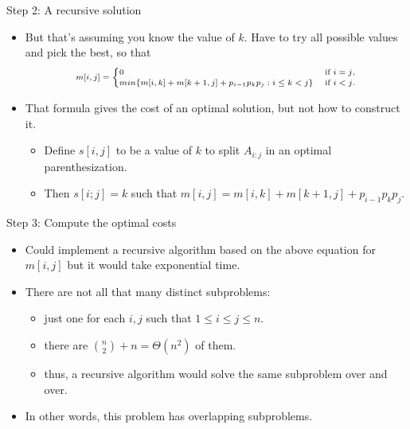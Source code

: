 \documentclass[aspectratio=169]{beamer}
\begin{document}
\begin{frame}{Step 2: A recursive solution}
    \begin{itemize}
        \item But that's assuming you know the value of $k$. Have to try all possible values and pick the best, so that
            \begin{equation*}
                \scriptsize
                \begin{align*}
                    m[i, j] =
                        \begin{cases}
                            0 & \text{ if } i = j \text{,} \\
                            min \{ m[i, k] + m[k+1, j] + p_{i-1} p_k p_j : i \leq k < j \} & \text{ if } i < j \text{.}
                        \end{cases}
                \end{align*}
            \end{equation*}
        \item That formula gives the cost of an optimal solution, but not how to construct it.
            \begin{itemize}
                \item Deﬁne $s[i, j]$ to be a value of $k$ to split $A_{i:j}$ in an optimal parenthesization.
                \item Then $s[i; j] = k$ such that $m[i, j] = m[i, k] + m[k+1, j] + p_{i-1} p_k p_j$.
            \end{itemize}
    \end{itemize}
\end{frame}

\begin{frame}{Step 3: Compute the optimal costs}
    \begin{itemize}
        \item Could implement a recursive algorithm based on the above equation for $m[i, j]$ but it would take exponential time.
        \item There are not all that many distinct subproblems:
            \begin{itemize}
                \item just one for each $i, j$ such that $1 \leq i \leq j \leq n$.
                \item there are ${n \choose 2} + n = \Theta (n^2)$ of them.
                \item thus, a recursive algorithm would solve the same subproblem over and over.
            \end{itemize}
        \item In other words, this problem has overlapping subproblems.
    \end{itemize}
\end{frame}
\end{document}
